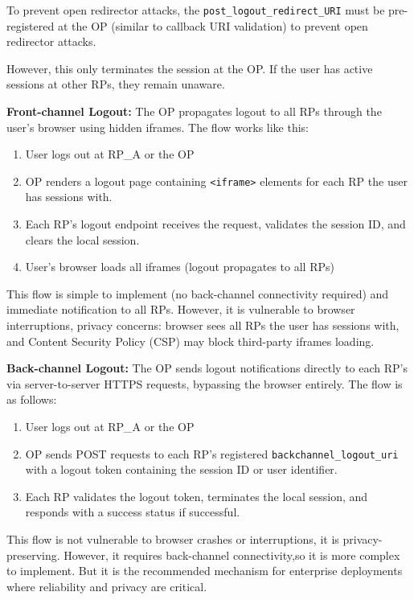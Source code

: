 \documentclass[../memoire.tex]{subfiles}
\begin{document}
To prevent open redirector attacks, the \texttt{post\_logout\_redirect\_URI} must be pre-registered at the OP (similar to callback URI validation) to prevent open redirector attacks.

However, this only terminates the session at the OP. If the user has active sessions at other RPs, they remain unaware. 

\textbf{Front-channel Logout:} The OP propagates logout to all RPs through the user's browser using hidden iframes. The flow works like this:
\begin{enumerate}
  \item User logs out at RP\_A or the OP
  \item OP renders a logout page containing \texttt{<iframe>} elements for each RP the user has sessions with.
  \item Each RP's logout endpoint receives the request, validates the session ID, and clears the local session.
  \item User's browser loads all iframes (logout propagates to all RPs)
\end{enumerate}

This flow is simple to implement (no back-channel connectivity required) and immediate notification to all RPs. However, it is vulnerable to browser interruptions, privacy concerns: browser sees all RPs the user has sessions with, and Content Security Policy (CSP) may block third-party iframes loading.

\textbf{Back-channel Logout:} The OP sends logout notifications directly to each RP's via server-to-server HTTPS requests, bypassing the browser entirely. The flow is as follows:
\begin{enumerate}
  \item User logs out at RP\_A or the OP
  \item OP sends POST requests to each RP's registered \texttt{backchannel\_logout\_uri} with a logout token containing the session ID or user identifier.
  \item Each RP validates the logout token, terminates the local session, and responds with a success status if successful.
\end{enumerate}

This flow is not vulnerable to browser crashes or interruptions, it is privacy-preserving. However, it requires back-channel connectivity,so it is more complex to implement. But it is the recommended mechanism for enterprise deployments where reliability and privacy are critical.
\end{document}
